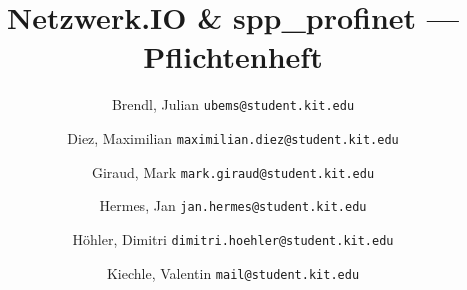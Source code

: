 \documentclass[a4paper]{scrreprt}
\newcommand{\sppname}{spp\_profinet }
\newcommand{\programname}{Netzwerk.IO }
\begin{document}
\title{\programname \& \sppname --- Pflichtenheft}
\author{
    Brendl, Julian
    \texttt{ubems@student.kit.edu}
    \and
    Diez, Maximilian
    \texttt{maximilian.diez@student.kit.edu}
    \and
    Giraud, Mark
    \texttt{mark.giraud@student.kit.edu}
    \and
    Hermes, Jan
    \texttt{jan.hermes@student.kit.edu}
    \and
    Höhler, Dimitri
    \texttt{dimitri.hoehler@student.kit.edu}
    \and
    Kiechle, Valentin
    \texttt{mail@student.kit.edu}
}
\maketitle



\newpage
\tableofcontents
\newpage



















\appendix

\end{document}
